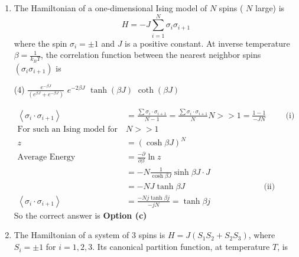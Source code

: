 \begin{enumerate}
\begin{answer}
	\begin{align*}
	\bar{n}&=k_{B} T \frac{1}{z}\left(\frac{\partial z}{\partial \mu}\right)_{V, T}=\frac{1}{e^{(\in-\mu) / k_{B} T}+1}\\
	\text{Variance }&=k_{B} T\left(\frac{d n}{d \mu}\right)_{V, T}=\bar{n}(1-\bar{n})
	\intertext{Note: This may also be divided using simple Bernoulli distribution.}
	\end{align*}
	So the correct answer is \textbf{Option (a)}
\end{answer}
	\item The Hamiltonian of a one-dimensional Ising model of $N$ spins ( $N$ large) is
	$$
	H=-J \sum_{i=1}^{N} \sigma_{i} \sigma_{i+1}
	$$
	where the spin $\sigma_{i}=\pm 1$ and $J$ is a positive constant. At inverse temperature $\beta=\frac{1}{k_{B} T}$, the correlation function between the nearest neighbor spins $\left(\sigma_{i} \sigma_{i+1}\right)$ is
	{}
	\begin{tasks}(4)
		\task[\textbf{a.}] $\frac{e^{-\beta J}}{\left(e^{\beta J}+e^{-\beta J}\right)}$
		\task[\textbf{b.}] $e^{-2 \beta J}$
		\task[\textbf{c.}] $\tanh (\beta J)$
		\task[\textbf{d.}] $\operatorname{coth}(\beta J)$
	\end{tasks}
\begin{answer}
	\begin{align*}
	\left\langle\sigma_{i} \cdot \sigma_{i+1}\right\rangle&=\frac{\sum \sigma_{i} \cdot \sigma_{i+1}}{N-1}=\frac{\sum \sigma_{i} \cdot \sigma_{i+1}}{N} N>>1=\frac{1-1}{-J N}\hspace{1cm}\text{(i)}\\
	\text{For such an Ising model for }&N>>1\\
	z&=(\cosh \beta J)^{N}\\
	\text{Average Energy }&=\frac{-\partial}{\partial \beta} \ln z\\
	&=-N \frac{1}{\cosh \beta J} \sinh \beta J \cdot J\\
	&=-N J \tanh \beta J\hspace{4cm}\text{(ii)}\\
	\left\langle\sigma_{i} \cdot \sigma_{i+1}\right\rangle&=\frac{-N j \tanh \beta j}{-j N}=\tanh \beta j
	\end{align*}
	So the correct answer is \textbf{Option (c)}
\end{answer}
	\item  The Hamiltonian of a system of 3 spins is $H=J\left(S_{1} S_{2}+S_{2} S_{3}\right)$, where $S_{i}=\pm 1$ for $i=1,2,3$. Its canonical partition function, at temperature $T$, is

\end{enumerate}

